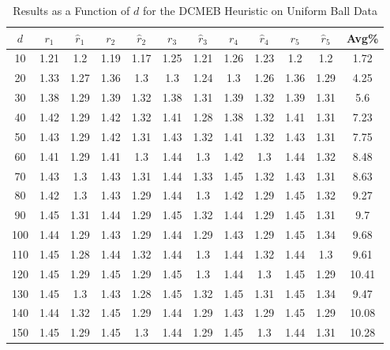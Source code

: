 \documentclass[11pt,twoside]{report}
\theoremstyle{definition}
\numberwithin{theorem}{section}
\numberwithin{definition}{section}
\numberwithin{lemma}{section}
\numberwithin{proposition}{section}
\numberwithin{equation}{section}
\numberwithin{figure}{section}
\begin{document}
\begin{appendices}
    \begin{table}[ht]
        \centering
        \begin{tabular}{|c||cc||cc||cc||cc||cc||c|} \hline
            $d$&$r_1$&$\hat{r}_1$&$r_2$&$\hat{r}_2$&$r_3$&$\hat{r}_3$&$r_4$&$\hat{r}_4$&$r_5$&$\hat{r}_5$&Avg\% \\ \hline
            10&1.21&1.2&1.19&1.17&1.25&1.21&1.26&1.23&1.2&1.2&1.72 \\
            20&1.33&1.27&1.36&1.3&1.3&1.24&1.3&1.26&1.36&1.29&4.25 \\
            30&1.38&1.29&1.39&1.32&1.38&1.31&1.39&1.32&1.39&1.31&5.6 \\
            40&1.42&1.29&1.42&1.32&1.41&1.28&1.38&1.32&1.41&1.31&7.23 \\
            50&1.43&1.29&1.42&1.31&1.43&1.32&1.41&1.32&1.43&1.31&7.75 \\
            60&1.41&1.29&1.41&1.3&1.44&1.3&1.42&1.3&1.44&1.32&8.48 \\
            70&1.43&1.3&1.43&1.31&1.44&1.33&1.45&1.32&1.43&1.31&8.63 \\
            80&1.42&1.3&1.43&1.29&1.44&1.3&1.42&1.29&1.45&1.32&9.27 \\
            90&1.45&1.31&1.44&1.29&1.45&1.32&1.44&1.29&1.45&1.31&9.7 \\
            100&1.44&1.29&1.43&1.29&1.44&1.29&1.43&1.29&1.45&1.34&9.68 \\
            110&1.45&1.28&1.44&1.32&1.44&1.3&1.44&1.32&1.44&1.3&9.61 \\
            120&1.45&1.29&1.45&1.29&1.45&1.3&1.44&1.3&1.45&1.29&10.41 \\
            130&1.45&1.3&1.43&1.28&1.45&1.32&1.45&1.31&1.45&1.34&9.47 \\
            140&1.44&1.32&1.45&1.29&1.44&1.29&1.43&1.29&1.45&1.29&10.08 \\
            150&1.45&1.29&1.45&1.3&1.44&1.29&1.45&1.3&1.44&1.31&10.28 \\ \hline
        \end{tabular}
        \caption{Results as a Function of $d$ for the DCMEB Heuristic on Uniform Ball Data}
        \label{tab:uniform_ball_dcmeb_table_d}
    \end{table}
    

\end{appendices}
\end{document}
